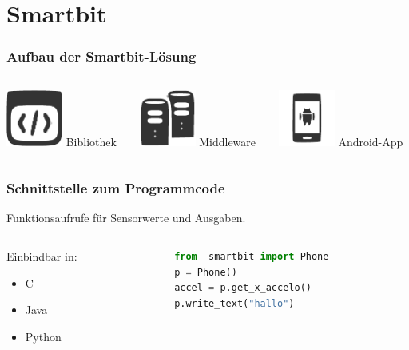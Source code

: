 \documentclass{beamer}
\begin{document}
\section{Smartbit}
\begin{frame}
    \frametitle{Aufbau der Smartbit-Lösung}
    \begin{columns}
        \begin{column}{0.3\textwidth}
            \centering
            \includegraphics[width=5em]{images/lib.pdf}
            Bibliothek
        \end{column}
        \begin{column}{0.3\textwidth}
            \centering
            \includegraphics[width=5em]{images/server.pdf}
            Middleware
        \end{column}
        \begin{column}{0.3\textwidth}
            \centering
            \includegraphics[width=5em]{images/android.pdf}
            Android-App
        \end{column}
    \end{columns}
\end{frame}

\begin{frame}[fragile]
    \frametitle{Schnittstelle zum Programmcode}
    Funktionsaufrufe für Sensorwerte und Ausgaben.
    \begin{columns}
        \begin{column}{0.3\textwidth}
            Einbindbar in:
            \begin{itemize}
                \item C
                \item Java
                \item Python
            \end{itemize}
        \end{column}
        \begin{column}{0.6\textwidth}
            \begin{lstlisting}[language=python]
from  smartbit import Phone
p = Phone()
accel = p.get_x_accelo()
p.write_text("hallo")
            \end{lstlisting}
        \end{column}

    \end{columns}
    
   
\end{frame}
\end{document}
